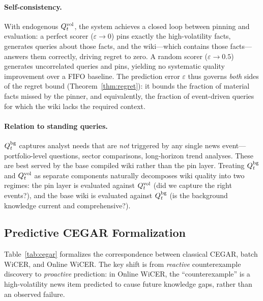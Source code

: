 \documentclass{article}
\begin{document}
\paragraph{Self-consistency.}
With endogenous $Q_t^{\textup{vol}}$, the system achieves a closed loop between pinning and evaluation:
a perfect scorer ($\varepsilon \to 0$) pins exactly the high-volatility facts, generates queries about those facts, and the wiki---which contains those facts---answers them correctly, driving regret to zero.
A random scorer ($\varepsilon \to 0.5$) generates uncorrelated queries and pins, yielding no systematic quality improvement over a FIFO baseline.
The prediction error $\varepsilon$ thus governs \emph{both} sides of the regret bound (Theorem~\ref{thm:regret}): it bounds the fraction of material facts missed by the pinner, and equivalently, the fraction of event-driven queries for which the wiki lacks the required context.

\paragraph{Relation to standing queries.}
$Q_t^{\textup{bg}}$ captures analyst needs that are \emph{not} triggered by any single news event---portfolio-level questions, sector comparisons, long-horizon trend analyses.
These are best served by the base compiled wiki rather than the pin layer.
Treating $Q_t^{\textup{bg}}$ and $Q_t^{\textup{vol}}$ as separate components naturally decomposes wiki quality into two regimes: the pin layer is evaluated against $Q_t^{\textup{vol}}$ (did we capture the right events?), and the base wiki is evaluated against $Q_t^{\textup{bg}}$ (is the background knowledge current and comprehensive?).

\subsection{Predictive CEGAR Formalization}
\label{sec:cegar}

Table~\ref{tab:cegar} formalizes the correspondence between classical CEGAR, batch WiCER, and Online WiCER.
The key shift is from \emph{reactive} counterexample discovery to \emph{proactive} prediction: in Online WiCER, the ``counterexample'' is a high-volatility news item predicted to cause future knowledge gaps, rather than an observed failure.
\end{document}
